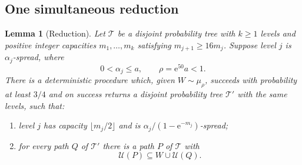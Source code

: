 \documentclass[11pt]{article}
\newtheorem{lemma}[theorem]{Lemma}
\numberwithin{equation}{section}
\newcommand{\TT}{\mathcal T}
\newcommand{\UU}{\mathcal U}
\newcommand{\ee}{\mathrm e}
\begin{document}
\subsection{One simultaneous reduction}

\begin{lemma}[Reduction]\label{lem:reduction}
Let $\TT$ be a disjoint probability tree with $k\ge1$ levels and
positive integer capacities $m_1,\ldots,m_k$ satisfying
$m_{j+1}\ge16m_j$. Suppose level $j$ is $\alpha_j$-spread, where
\[
 0<\alpha_j\le a,\qquad \rho=\ee^{50}a<1.
\]
There is a deterministic procedure which, given $W\sim\mu_\rho$,
succeeds with probability at least $3/4$ and on success returns a
disjoint probability tree $\TT'$ with the same levels, such that:
\begin{enumerate}[label=(\roman*),leftmargin=2.2em,itemsep=3pt]
 \item level $j$ has capacity $\lfloor m_j/2\rfloor$ and is
 $\alpha_j/(1-\ee^{-m_j})$-spread;
 \item for every path $Q$ of $\TT'$ there is a path $P$ of $\TT$ with
 \begin{equation}\label{eq:recovery}
   \UU(P)\subseteq W\cup\UU(Q).
 \end{equation}
\end{enumerate}
\end{lemma}
\end{document}
